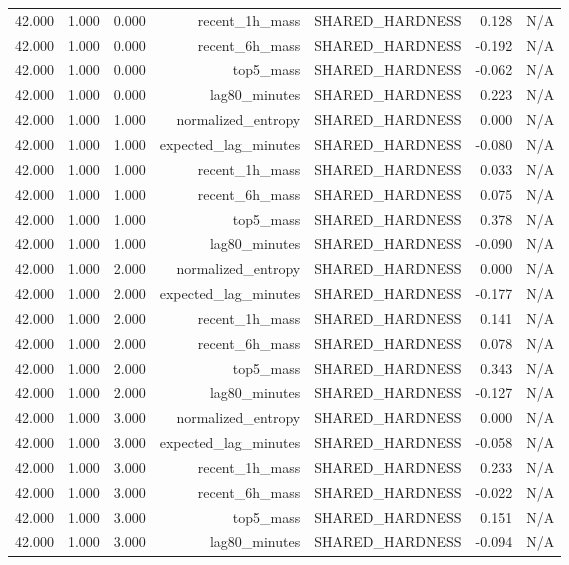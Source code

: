 \begin{table}[h!]
\begin{tabular}{lrrrrrr}
42.000 & 1.000 & 0.000 & recent\_1h\_mass & SHARED\_HARDNESS & 0.128 & N/A \\
42.000 & 1.000 & 0.000 & recent\_6h\_mass & SHARED\_HARDNESS & -0.192 & N/A \\
42.000 & 1.000 & 0.000 & top5\_mass & SHARED\_HARDNESS & -0.062 & N/A \\
42.000 & 1.000 & 0.000 & lag80\_minutes & SHARED\_HARDNESS & 0.223 & N/A \\
42.000 & 1.000 & 1.000 & normalized\_entropy & SHARED\_HARDNESS & 0.000 & N/A \\
42.000 & 1.000 & 1.000 & expected\_lag\_minutes & SHARED\_HARDNESS & -0.080 & N/A \\
42.000 & 1.000 & 1.000 & recent\_1h\_mass & SHARED\_HARDNESS & 0.033 & N/A \\
42.000 & 1.000 & 1.000 & recent\_6h\_mass & SHARED\_HARDNESS & 0.075 & N/A \\
42.000 & 1.000 & 1.000 & top5\_mass & SHARED\_HARDNESS & 0.378 & N/A \\
42.000 & 1.000 & 1.000 & lag80\_minutes & SHARED\_HARDNESS & -0.090 & N/A \\
42.000 & 1.000 & 2.000 & normalized\_entropy & SHARED\_HARDNESS & 0.000 & N/A \\
42.000 & 1.000 & 2.000 & expected\_lag\_minutes & SHARED\_HARDNESS & -0.177 & N/A \\
42.000 & 1.000 & 2.000 & recent\_1h\_mass & SHARED\_HARDNESS & 0.141 & N/A \\
42.000 & 1.000 & 2.000 & recent\_6h\_mass & SHARED\_HARDNESS & 0.078 & N/A \\
42.000 & 1.000 & 2.000 & top5\_mass & SHARED\_HARDNESS & 0.343 & N/A \\
42.000 & 1.000 & 2.000 & lag80\_minutes & SHARED\_HARDNESS & -0.127 & N/A \\
42.000 & 1.000 & 3.000 & normalized\_entropy & SHARED\_HARDNESS & 0.000 & N/A \\
42.000 & 1.000 & 3.000 & expected\_lag\_minutes & SHARED\_HARDNESS & -0.058 & N/A \\
42.000 & 1.000 & 3.000 & recent\_1h\_mass & SHARED\_HARDNESS & 0.233 & N/A \\
42.000 & 1.000 & 3.000 & recent\_6h\_mass & SHARED\_HARDNESS & -0.022 & N/A \\
42.000 & 1.000 & 3.000 & top5\_mass & SHARED\_HARDNESS & 0.151 & N/A \\
42.000 & 1.000 & 3.000 & lag80\_minutes & SHARED\_HARDNESS & -0.094 & N/A \\

\end{tabular}
\end{table}

